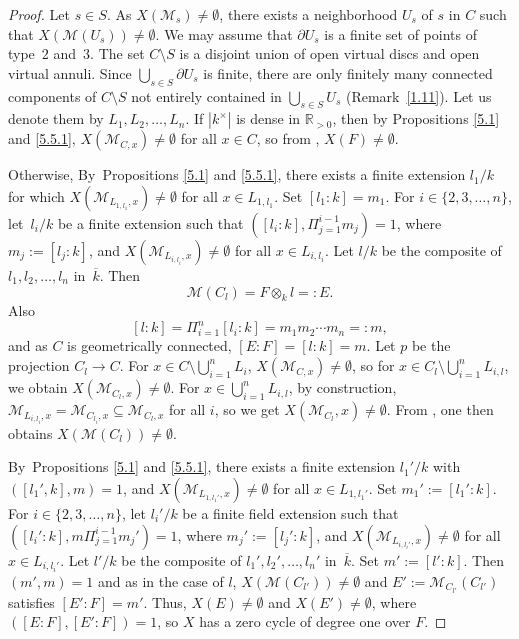 \documentclass[JEP,XML,SOM,Unicode,NoFloatCountersInSection,published]{cedram}
\let\backslash\setminus
\theoremstyle{definition}
\begin{document}
\begin{proof} Let $s \in S$.
As $X(\mathscr{M}_{s}) \neq \emptyset$, there exists a neighborhood $U_s$ of $s$ in $C$ such that ${X(\mathscr{M}(U_s)) \neq \emptyset}$. We may assume that $\partial{U_s}$ is a finite set of points of type~$2$ and~$3$. The set $C \backslash S$ is a disjoint union of open virtual discs and open virtual annuli. Since $\bigcup_{s\in S}\partial{U_s}$ is finite, there are only finitely many connected components of $C \backslash S$ not entirely contained in $\bigcup_{s\in S} U_s$ (\cf Remark~\ref{1.11}). Let us denote them by $L_1,L_2, \dots, L_n$. If $|k^{\times}|$ is dense in $\mathbb{R}_{>0}$, then by Propositions \ref{5.1} and \ref{5.5.1}, $X(\mathscr{M}_{C,x}) \neq \emptyset$ for all $x \in C$, so from \cite[Th.\,3.11]{une}, $X(F) \neq \emptyset$.

Otherwise, By~Propositions \ref{5.1} and \ref{5.5.1}, there exists a finite extension $l_1/k$ for which ${X(\mathscr{M}_{L_{1,l_1},x}) \neq \emptyset}$ for all $x \in L_{1, l_1}$. Set $[l_1:k]=m_1$. For $i \in \{2,3,\dots, n\}$, let~$l_i/k$ be a finite extension such that $([l_i:k], \Pi_{j=1}^{i-1} m_j)=1$, where $m_{j}:=[l_{j}:k]$, and $X(\mathscr{M}_{L_{i,l_i},x}) \neq \emptyset$ for all $x \in L_{i, l_i}$.
Let $l/k$ be the composite of $l_1, l_2, \dots, l_n$ in~$\overline{k}$. Then
\[
\mathscr{M}(C_l)=F \otimes_k l=:E.
\]
Also
\[
{[l:k]=\Pi_{i=1}^n [l_i:k]}=m_1m_2\cdots m_n=:m,
\]
and as $C$ is geometrically connected, $[E:F]=[l:k]=m$. Let $p$ be the projection $C_l \to C$. For $x \in C \backslash \bigcup_{i=1}^n L_i$, $X(\mathscr{M}_{C,x}) \neq \emptyset$, so for $x \in C_l \backslash \bigcup_{i=1}^n L_{i,l}$, we obtain $X(\mathscr{M}_{C_l,x}) \neq \emptyset$. For $x \in \bigcup_{i=1}^n L_{i,l}$, by construction, $\mathscr{M}_{L_{i,l_i},x}=\mathscr{M}_{C_{l_i}, x} \subseteq \mathscr{M}_{C_l,x}$ for all $i$, so we get $X(\mathscr{M}_{C_l},x) \neq \emptyset$. From \cite[Th.\,3.11]{une}, one then obtains ${X(\mathscr{M}(C_l)) \neq \emptyset}$.

By~Propositions \ref{5.1} and \ref{5.5.1}, there exists a finite extension $l_1'/k$ with ${([l_1',k],m)=1}$, and $X(\mathscr{M}_{L_{1, l_1'},x}) \neq \emptyset$ for all $x \in L_{1, l_1'}$. Set $m_1':=[l_1':k]$. For $i \in \{2,3,\dots, n\}$, let $l_i'/k$ be a finite field extension such that $([l_i':k], m\Pi_{j=1}^{i-1} m_j')=1$, where $m_{j}':=[l_{j}':k]$, and $X(\mathscr{M}_{L_{i,l_i'},x}) \neq \emptyset$ for all $x \in L_{i, l_i'}$.
Let $l'/k$ be the composite of $l_1', l_2', \dots, l_n'$ in~$\overline{k}$. Set $m':=[l':k]$. Then $(m', m)=1$ and as in the case of $l$, $X(\mathscr{M}(C_{l'})) \neq \emptyset$ and $E':=\mathscr{M}_{C_{l'}}(C_{l'})$ satisfies $[E':F]=m'$.
Thus, $X(E) \neq \emptyset$ and $X(E') \neq \emptyset$, where $([E:F], [E':F])=1$, so $X$ has a zero cycle of degree one over $F$.
\end{proof}
\end{document}
